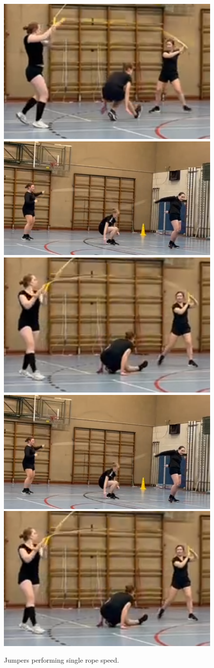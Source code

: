 \begin{figure}
    \includegraphics[height=0.14\linewidth]{img/dd3-du-crab-cross-7}
    \includegraphics[height=0.14\linewidth]{img/dd3-du-flip-ts-8}
    \includegraphics[height=0.14\linewidth]{img/dd3-du-crab-cross-8}
    \includegraphics[height=0.14\linewidth]{img/dd3-du-flip-ts-8}
    \includegraphics[height=0.14\linewidth]{img/dd3-du-crab-cross-8}    \label{fig:skills}
    \caption[Jumpers performing single rope speed]{Jumpers performing single rope speed.}
\end{figure}